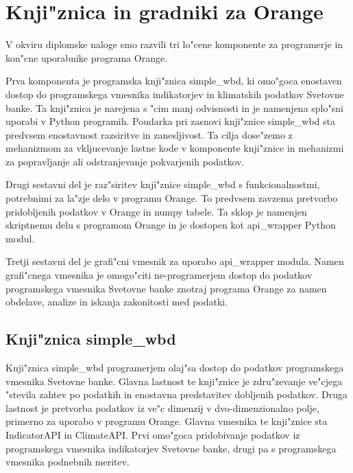 
\chapter{Knji"znica in gradniki za Orange}

V okviru diplomske naloge smo razvili tri lo"cene komponente za programerje in
kon"cne uporabnike programa Orange. 

Prva komponenta je programska knji"znica simple\_wbd, ki
omo"goca enostaven dostop do programskega vmesnika indikatorjev in klimatskih
podatkov Svetovne banke. Ta knji"znica je narejena s "cim manj odvisnosti in je 
namenjena splo"sni uporabi v Python programih. Poudarka pri zasnovi knji"znice 
simple\_wbd sta predvsem enostavnost razsiritve in zanesljivost. Ta cilja
dose"zemo z mehanizmom za vkljucevanje lastne kode v komponente knji"znice
in mehanizmi za popravljanje ali odstranjevanje pokvarjenih podatkov.

Drugi sestavni del je raz"siritev knji"znice simple\_wbd s funkcionalnostmi, 
potrebnimi za la"zje delo v programu Orange. To predvsem zavzema pretvorbo
pridobljenih podatkov v Orange in numpy tabele. Ta sklop je namenjen skriptnemu
delu s programom Orange in je dostopen kot api\_wrapper Python modul. 

Tretji sestavni del je grafi"cni vmesnik za uporabo api\_wrapper modula. Namen
grafi"cnega vmesnika je omogo"citi ne-programerjem dostop do podatkov 
programskega vmesnika Svetovne banke znotraj programa Orange za namen obdelave,
analize in iskanja zakonitosti med podatki.

\section{Knji"znica simple\_wbd}

Knji"znica simple\_wbd programerjem olaj"sa dostop do podatkov programskega 
vmesnika Svetovne banke. Glavna lastnost te knji"znice je zdru"zevanje ve"cjega 
"stevila zahtev po podatkih in enostavna predstavitev dobljenih podatkov. 
Druga lastnost je pretvorba podatkov iz ve"c dimenzij v dvo-dimenzionalno polje,
primerno za uporabo v programu Orange. Glavna vmesnika te knji"znice sta 
IndicatorAPI in ClimateAPI. Prvi omo"goca pridobivanje podatkov iz programskega 
vmesnika indikatorjev Svetovne banke, drugi pa s programskega vmesnika
podnebnih meritev.





